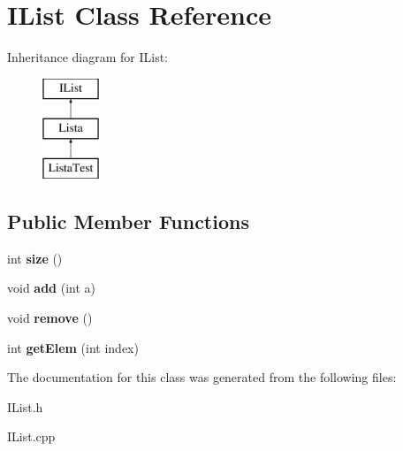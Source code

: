 \hypertarget{class_i_list}{\section{I\-List Class Reference}
\label{class_i_list}
}
Inheritance diagram for I\-List\-:\begin{figure}[H]
\begin{center}
\leavevmode
\includegraphics[height=3.000000cm]{class_i_list}
\end{center}
\end{figure}
\subsection*{Public Member Functions}
\begin{DoxyCompactItemize}
\item 
\hypertarget{class_i_list_ab79348ba7116b9a204b2f7f389e2f3e9}{int {\bfseries size} ()}\label{class_i_list_ab79348ba7116b9a204b2f7f389e2f3e9}

\item 
\hypertarget{class_i_list_a1ab72644b90e917b927de7392aea6af9}{void {\bfseries add} (int a)}\label{class_i_list_a1ab72644b90e917b927de7392aea6af9}

\item 
\hypertarget{class_i_list_a7db3e8a2b0dfc7bd3c1fcecea79f2f1b}{void {\bfseries remove} ()}\label{class_i_list_a7db3e8a2b0dfc7bd3c1fcecea79f2f1b}

\item 
\hypertarget{class_i_list_a6c7987cdd1aeb40da2df1ae9e91d59c4}{int {\bfseries get\-Elem} (int index)}\label{class_i_list_a6c7987cdd1aeb40da2df1ae9e91d59c4}

\end{DoxyCompactItemize}


The documentation for this class was generated from the following files\-:\begin{DoxyCompactItemize}
\item 
I\-List.\-h\item 
I\-List.\-cpp\end{DoxyCompactItemize}
